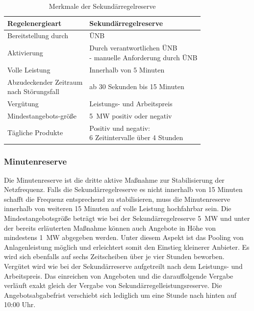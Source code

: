 			\begin{table}[H]
				\centering
				\caption{Merkmale der Sekundärregelreserve}
				\label{Tab. Merkmale der Sekundärregelreserve}
				\begin{tabular}{ll}
					\hline
					Regelenergieart &  Sekundärregelreserve  \\ \hline
					Bereitstellung durch  & ÜNB  \\
					Aktivierung & \makecell[l]{Durch verantwortlichen ÜNB \\ - manuelle Anforderung durch ÜNB} \\
					Volle Leistung & Innerhalb von 5 Minuten \\
					\makecell[l]{Abzudeckender Zeitraum \\ nach Störungsfall} & ab 30 Sekunden bis 15 Minuten \\
					Vergütung &  Leistungs- und Arbeitspreis \\
					Mindestangebots-größe & \SI{5}{\mega\watt} positiv oder negativ \\
					Tägliche Produkte & \makecell[l]{Positiv und negativ: \\ \num{6} Zeitintervalle über \num{4} Stunden} \\ \hline
				\end{tabular}
			\end{table}
	
		\subsubsection{Minutenreserve}
		
			Die Minutenreserve ist die dritte aktive Maßnahme zur Stabilisierung der Netzfrequenz. 
			Falls die Sekundärregelreserve es nicht innerhalb von \num{15} Minuten schafft die Frequenz entsprechend zu stabilisieren, muss die Minutenreserve innerhalb von weiteren \num{15} Minuten auf volle Leistung hochfahrbar sein.
			Die Mindestangebotsgröße beträgt wie bei der Sekundärregelreserve \SI{5}{\mega\watt} und unter der bereits erläuterten Maßnahme können auch Angebote in Höhe von mindestens \SI{1}{\mega\watt} abgegeben werden.
			Unter diesem Aspekt ist das Pooling von Anlagenleistung möglich und erleichtert somit den Einstieg kleinerer Anbieter.
			Es wird sich ebenfalls auf sechs Zeitscheiben über je vier Stunden beworben. \\
			
			Vergütet wird wie bei der Sekundärreserve aufgetreilt nach dem Leistungs- und Arbeitspreis.
			Das einreichen von Angeboten und die darauffolgende Vergabe verläuft exakt gleich der Vergabe von Sekundärregelleistungsreserve.
			Die Angebotsabgabefrist verschiebt sich lediglich um eine Stunde nach hinten auf 10:00 Uhr.
	
